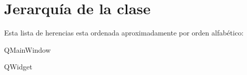 \section{Jerarquía de la clase}
Esta lista de herencias esta ordenada aproximadamente por orden alfabético\+:\begin{DoxyCompactList}
\item Q\+Main\+Window\begin{DoxyCompactList}
\item {}
\end{DoxyCompactList}
\item Q\+Widget\begin{DoxyCompactList}
\item {}
\item {}
\end{DoxyCompactList}
\end{DoxyCompactList}

